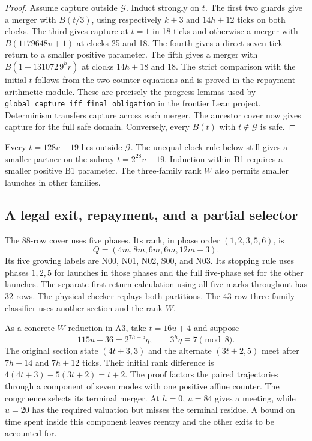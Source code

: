 \begin{proof}
Assume capture outside $\mathcal G$. Induct strongly on $t$. The first two guards
give a merger with $B(t/3)$, using respectively $k+3$ and $14h+12$
ticks on both clocks. The third
gives capture at $t=1$ in 18 ticks and otherwise a merger with
$B(1179648v+1)$ at clocks 25 and 18. The fourth gives a direct seven-tick
return to a smaller positive parameter. The fifth gives a merger with
$B(1+131072\,9^h r)$ at clocks $14h+18$ and 18. The strict comparison
with the initial $t$ follows from the two counter equations and is proved
in the repayment arithmetic module. These are precisely the progress
lemmas used by \texttt{global\_capture\_iff\_final\_obligation} in the
frontier Lean project. Determinism transfers capture across each merger.
The ancestor cover now gives capture for the full safe domain.
Conversely, every $B(t)$ with $t\notin\mathcal G$ is safe.
\end{proof}

Every $t=128v+19$ lies outside $\mathcal G$. The unequal-clock rule
below still gives a smaller partner on the subray $t=2^{28}v+19$.
Induction within B1 requires a smaller positive B1 parameter. The
three-family rank $W$ also permits smaller launches in other families.

\subsection{A legal exit, repayment, and a partial selector}
\label{sec:legal-exits}

The 88-row cover uses five phases. Its rank, in phase order
$(1,2,3,5,6)$, is
\[ Q=(4m,8m,6m,6m,12m+3). \]
Its five growing labels are
N00, N01, N02, S00, and N03. Its stopping rule uses phases $1,2,5$ for
launches in those phases and the full five-phase set for the other
launches. The separate first-return calculation using all five marks
throughout has 32 rows. The physical checker replays both partitions.
The 43-row three-family classifier uses another section and the rank $W$.

As a concrete $W$ reduction in A3, take $t=16u+4$ and suppose
\[
 115u+36=2^{7h+5}q,\qquad 3^h q\equiv7\pmod 8 .
\]
The original section state $(4t+3,3)$ and the alternate $(3t+2,5)$
meet after $7h+14$ and $7h+12$ ticks. Their initial rank difference is
$4(4t+3)-5(3t+2)=t+2$. The proof factors the paired trajectories
through a component of seven modes with one positive affine counter.
The congruence selects its terminal merger. At $h=0$, $u=84$ gives a
meeting, while $u=20$ has the required valuation but misses the terminal
residue. A bound on time spent inside this component leaves reentry and
the other exits to be accounted for.

